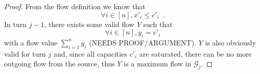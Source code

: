 \begin{proof}
   From the flow definition we know that
   \begin{equation}
   \label{saturation:flowleqcap}
      \forall i \in [n], x'_i \leq c'_i \enspace.
   \end{equation}
   In turn $j-1$, there exists some valid flow $Y$ such that
   \begin{equation*}
      \forall i \in [n], y_i = c'_i
   \end{equation*}
   with a flow value $\sum\limits_{i=1}^{n}y_i$ (NEEDS PROOF/ARGUMENT). $Y$ is also obviously valid for turn $j$ and, since
   all capacities $c'_i$ are saturated, there can be no more outgoing flow from the source, thus $Y$ is a maximum flow in
   $\mathcal{G}_j$.
\end{proof}
